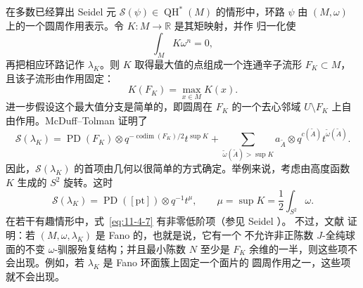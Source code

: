 \begin{example}\label{ex:11-4-8}
在多数已经算出 Seidel 元 $\mathcal S(\psi)\in\operatorname{QH}^*(M)$ 的情形中，环路
$\psi$ 由 $(M,\omega)$ 上的一个圆周作用表示。令 $K:M\to\mathbb R$ 是其矩映射，并作
归一化使
\[
  \int_M K\omega^n=0,
\]
再把相应环路记作 $\lambda_K$。则 $K$ 取得最大值的点组成一个连通辛子流形
$F_K\subset M$，且该子流形由作用固定：
\[
  K(F_K)=\max_{x\in M}K(x).
\]
进一步假设这个最大值分支是简单的，即圆周在 $F_K$ 的一个去心邻域
$U\setminus F_K$ 上自由作用。McDuff--Tolman  证明了
\begin{equation}\label{eq:11-4-7}
  \mathcal S(\lambda_K)
  =\operatorname{PD}(F_K)\otimes
   q^{-\operatorname{codim}(F_K)/2}t^{\sup K}
  +\sum_{\widetilde\omega(\widetilde A)>\sup K}
   a_{\widetilde A}\otimes
   q^{c(\widetilde A)}t^{\widetilde\omega(\widetilde A)}.
\end{equation}
因此，$\mathcal S(\lambda_K)$ 的首项由几何以很简单的方式确定。举例来说，考虑由高度函数
$K$ 生成的 $S^2$ 旋转。这时
\[
  \mathcal S(\lambda_K)=\operatorname{PD}([\mathrm{pt}])\otimes q^{-1}t^\mu,
  \qquad
  \mu=\sup K=\frac12\int_{S^2}\omega.
\]
在若干有趣情形中，式~\eqref{eq:11-4-7} 有非零低阶项（参见 Seidel ）。
不过，文献  证明：若 $(M,\omega,\lambda_K)$ 是 Fano 的，也就是说，它有一个
不允许非正陈数 $J$-全纯球面的不变 $\omega$-驯服殆复结构；并且最小陈数 $N$ 至少是
$F_K$ 余维的一半，则这些项不会出现。例如，若 $\lambda_K$ 是 Fano 环面簇上固定一个面片的
圆周作用之一，这些项就不会出现。
\end{example}

